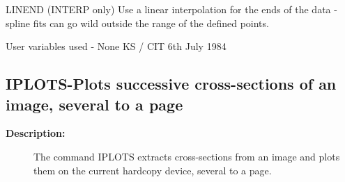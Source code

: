 \begin{description}
\begin{description}
\begin{terminalv}
 LINEND     (INTERP only) Use a linear interpolation for the
            ends of the data - spline fits can go wild outside the
            range of the defined points.

 User variables used - None
                                  KS / CIT 6th July 1984
\end{terminalv}
\end{description}
\subsection{IPLOTS-\label{IPLOTS}Plots successive cross-sections of an image, several to a page}
\begin{description}

\item [\textbf{Description:}]
 The command IPLOTS extracts cross-sections from an image
 and plots them on the current hardcopy device, several
 to a page.


\end{description}
\end{description}
